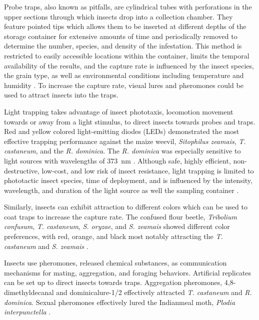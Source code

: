 \documentclass[../Vibro-Acoustic Signatures and Detection Algorithms for Stored Product Insects.tex]{subfiles}
\begin{document}
Probe traps, also known as pitfalls, are cylindrical tubes with perforations in the upper sections through which insects drop into a collection chamber. They feature pointed tips which allows them to be inserted at different depths of the storage container for extensive amounts of time and periodically removed to determine the number, species, and density of the infestation. This method is restricted to easily accessible locations within the container, limits the temporal availability of the results, and the capture rate is influenced by the insect species, the grain type, as well as environmental conditions including temperature and humidity \cite{neethirajanDetectionTechniquesStoredProduct2007}. To increase the capture rate, visual lures and pheromones could be used to attract insects into the traps.

Light trapping takes advantage of insect phototaxis, locomotion movement towards or away from a light stimulus, to direct insects towards probes and traps. Red and yellow colored light-emitting diodes (LEDs) demonstrated the most effective trapping performance against the maize weevil, \textit{Sitophilus zeamais}, \textit{T. castaneum}, and the \textit{R. dominica}. The \textit{R. dominica} was especially sensitive to light sources with wavelengths of \SI{373}{\nano\meter} \cite{gongTechnologiesSystemsPest2026}. Although safe, highly efficient, non-destructive, low-cost, and low risk of insect resistance, light trapping is limited to phototactic insect species, time of deployment, and is influenced by the intensity, wavelength, and duration of the light source as well the sampling container \cite{stermerSpectralResponseCertain1959, gongTechnologiesSystemsPest2026}.

Similarly, insects can exhibit attraction to different colors which can be used to coat traps to increase the capture rate. The confused flour beetle, \textit{Tribolium confusum}, \textit{T. castaneum}, \textit{S. oryzae}, and \textit{S. zeamais} showed different color preferences, with red, orange, and black most notably attracting the \textit{T. castaneum} and \textit{S. zeamais} \cite{gongTechnologiesSystemsPest2026}.

Insects use pheromones, released chemical substances, as communication mechanisms for mating, aggregation, and foraging behaviors. Artificial replicates can be set up to direct insects towards traps. Aggregation pheromones, 4,8-dimethyldecanal and dominicalure-1/2 effectively attracted \textit{T. castaneum} and \textit{R. dominica}. Sexual pheromones effectively lured the Indianmeal moth, \textit{Plodia interpunctella} \cite{gongTechnologiesSystemsPest2026}.
\end{document}
